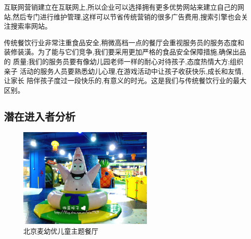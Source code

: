 互联网营销建立在互联网上,所以企业可以选择拥有更多优势网站来建立自己的网
站,然后专门进行维护管理,这样可以节省传统营销的很多广告费用,搜索引擎也会关
注搜索率网站。

传统餐饮行业非常注重食品安全,稍微高档一点的餐厅会重视服务员的服务态度和
装修装潢。为了能与它们竞争,我们要采用更加严格的食品安全保障措施,确保出品的
质量;我们的服务员要有像幼儿园老师一样的耐心对待孩子,态度热情大方;组织亲子
活动的服务人员要熟悉幼儿心理,在游戏活动中让孩子收获快乐,成长和友情,让家长
陪伴孩子度过一段快乐的,有意义的时光。这是我们与传统餐饮行业的最大区别。

\subsection{潜在进入者分析}


\begin{figure}[htbp]
        \caption{北京麦幼优儿童主题餐厅}
        \centering
        \includegraphics[width=0.6\textwidth]{../images/competitors/北京麦幼优儿童主题餐厅}
\end{figure}

